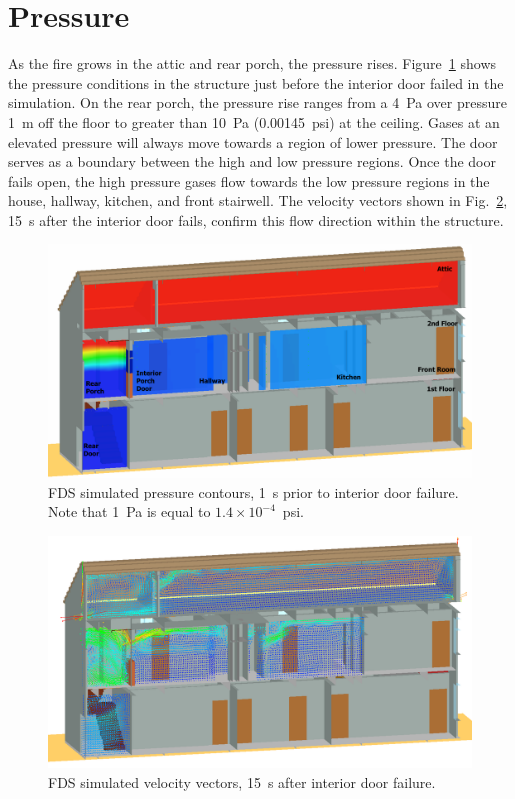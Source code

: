 \documentclass[12pt,oneside]{book}
\begin{document}
\section{Pressure}

As the fire grows in the attic and rear porch, the pressure rises. Figure~\ref{fig:pres_159s} shows the pressure conditions in the structure just before the interior door failed in the simulation. On the rear porch, the pressure rise ranges from a 4~Pa over pressure 1~m off the floor to greater than 10~Pa (0.00145~psi) at the ceiling. Gases at an elevated pressure will always move towards a region of lower pressure. The door serves as a boundary between the high and low pressure regions. Once the door fails open, the high pressure gases flow towards the low pressure regions in the house, hallway, kitchen, and front stairwell. The velocity vectors shown in Fig.~\ref{fig:velo_175s}, 15~s after the interior door fails, confirm this flow direction within the structure.

\begin{figure}[!ht]
\includegraphics[width=.75\textwidth]{../Figures/west_50th_baseline_pres2}

\caption[FDS simulated pressure contours, 1~s prior to interior door failure.]{FDS simulated pressure contours, 1~s prior to interior door failure. Note that 1~Pa is equal to $1.4 \times 10 ^{-4}$~psi.}
\label{fig:pres_159s}
\end{figure}

\newpage
\begin{landscape}
\centering
\begin{figure}[!ht]
\includegraphics[width=1.1\textwidth]{../Figures/west_50th_baseline_velo_175}


\caption{FDS simulated velocity vectors, 15~s after interior door failure.}
\label{fig:velo_175s}
\end{figure}
\end{landscape}
\newpage
\end{document}
